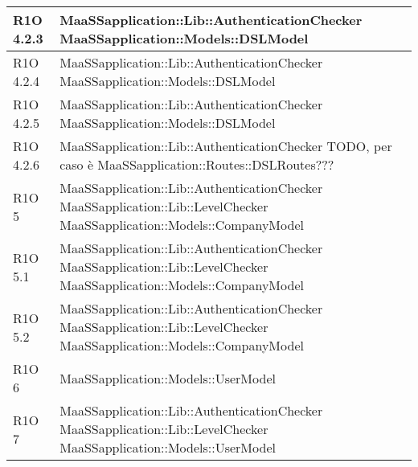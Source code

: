 \begin{center}
\begin{longtable}{ | l | p{8cm} |}
	R1O 4.2.3 & MaaSSapplication::Lib::AuthenticationChecker \newline  MaaSSapplication::Models::DSLModel  \newline  \\ \hline
	
	R1O 4.2.4 & MaaSSapplication::Lib::AuthenticationChecker \newline  MaaSSapplication::Models::DSLModel  \newline  \\ \hline
	
	R1O 4.2.5 & MaaSSapplication::Lib::AuthenticationChecker \newline  MaaSSapplication::Models::DSLModel  \newline  \\ \hline
	
	R1O 4.2.6 & MaaSSapplication::Lib::AuthenticationChecker \newline  TODO, per caso è MaaSSapplication::Routes::DSLRoutes???  \newline  \\ \hline
	
	R1O 5 & MaaSSapplication::Lib::AuthenticationChecker \newline MaaSSapplication::Lib::LevelChecker \newline  MaaSSapplication::Models::CompanyModel  \newline  \\ \hline
	
	R1O 5.1 & MaaSSapplication::Lib::AuthenticationChecker \newline MaaSSapplication::Lib::LevelChecker \newline MaaSSapplication::Models::CompanyModel  \newline  \\ \hline
	
	R1O 5.2 & MaaSSapplication::Lib::AuthenticationChecker \newline MaaSSapplication::Lib::LevelChecker \newline  MaaSSapplication::Models::CompanyModel  \newline  \\ \hline
	
	R1O 6 & MaaSSapplication::Models::UserModel \newline  \\ \hline
	
	R1O 7 &MaaSSapplication::Lib::AuthenticationChecker \newline MaaSSapplication::Lib::LevelChecker \newline  MaaSSapplication::Models::UserModel  \newline  \\ \hline
	

\end{longtable}
\end{center}
